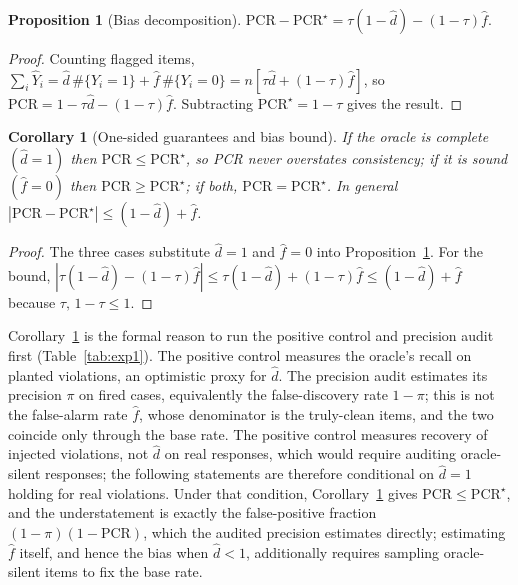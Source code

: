 \documentclass[pdflatex,sn-nature]{sn-jnl}
\newtheorem{proposition}{Proposition}
\newtheorem{corollary}{Corollary}
\newcommand{\rev}[1]{#1}
\newcommand{\rev}[1]{{\color{blue}#1}}
\begin{document}
\begin{proposition}[Bias decomposition]\label{prop:bias}
$\mathrm{PCR}-\mathrm{PCR}^\star=\tau(1-\hat d)-(1-\tau)\hat f.$
\end{proposition}
\begin{proof}
Counting flagged items,
$\sum_i\hat Y_i=\hat d\,\#\{Y_i{=}1\}+\hat f\,\#\{Y_i{=}0\}=n[\tau\hat d+(1-\tau)\hat f]$,
so $\mathrm{PCR}=1-\tau\hat d-(1-\tau)\hat f$. Subtracting $\mathrm{PCR}^\star=1-\tau$
gives the result.
\end{proof}

\begin{corollary}[One-sided guarantees and bias bound]\label{cor:onesided}
If the oracle is complete $(\hat d=1)$ then $\mathrm{PCR}\le\mathrm{PCR}^\star$, so PCR
never overstates consistency; if it is sound $(\hat f=0)$ then
$\mathrm{PCR}\ge\mathrm{PCR}^\star$; if both, $\mathrm{PCR}=\mathrm{PCR}^\star$. In
general $|\mathrm{PCR}-\mathrm{PCR}^\star|\le(1-\hat d)+\hat f$.
\end{corollary}
\begin{proof}
The three cases substitute $\hat d=1$ and $\hat f=0$ into
Proposition~\ref{prop:bias}. For the bound,
$|\tau(1-\hat d)-(1-\tau)\hat f|\le\tau(1-\hat d)+(1-\tau)\hat f\le(1-\hat d)+\hat f$
because $\tau,\,1-\tau\le1$.
\end{proof}

\noindent Corollary~\ref{cor:onesided} is the formal reason to run the positive control
and precision audit first (Table~\ref{tab:exp1}). The positive control \rev{measures the
oracle's recall on planted violations, an optimistic proxy for} $\hat d$. The precision audit estimates its
precision $\pi$ on fired cases, equivalently the false-discovery rate $1-\pi$; this is not
the false-alarm rate $\hat f$, whose denominator is the truly-clean items, and the two
coincide only through the base rate. \rev{The positive control measures recovery of injected
violations, not $\hat d$ on real responses, which would require auditing oracle-silent responses;
the following statements are therefore conditional on $\hat d=1$ holding for real violations.}
Under \rev{that condition}, Corollary~\ref{cor:onesided} gives $\mathrm{PCR}\le\mathrm{PCR}^\star$,
and the understatement is exactly the false-positive fraction $(1-\pi)(1-\mathrm{PCR})$, which the
audited precision estimates directly; estimating $\hat f$ itself, and hence the bias when
$\hat d<1$, additionally requires sampling oracle-silent items to fix the base rate.
\end{document}

